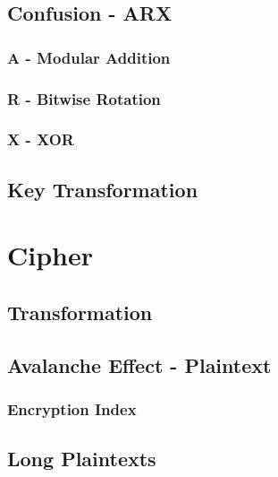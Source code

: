 \documentclass[fleqn, a4paper,12pt]{article}
\begin{document}
\subsection{Confusion - ARX}

\subsubsection{A - Modular Addition} %

\subsubsection{R - Bitwise Rotation} %

\subsubsection{X - XOR} %

\subsection{Key Transformation} %

\section {Cipher}

\subsection{Transformation}

\subsection {Avalanche Effect - Plaintext}

\subsubsection {Encryption Index}

\subsection {Long Plaintexts}
\end{document}

